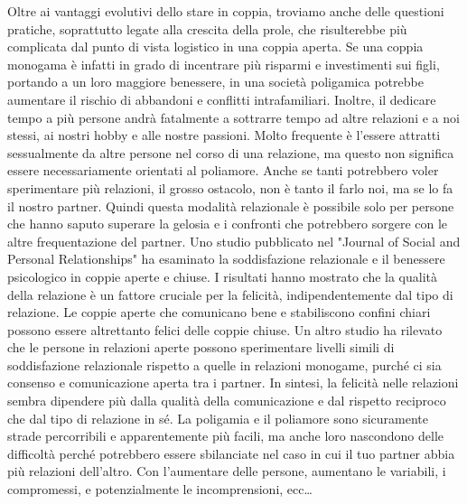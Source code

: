 \documentclass[12pt]{book} %
\begin{document}
Oltre ai vantaggi evolutivi dello stare in coppia, troviamo anche delle questioni pratiche, soprattutto legate alla
crescita della prole, che risulterebbe più complicata dal punto di vista logistico in una coppia aperta. 
Se una coppia monogama è infatti in grado di incentrare più
risparmi e investimenti sui figli, portando a un loro maggiore benessere, in una società poligamica potrebbe aumentare
il rischio di abbandoni e conflitti intrafamiliari. Inoltre, il dedicare tempo a più persone andrà
fatalmente a sottrarre tempo ad altre relazioni e a noi stessi, ai nostri hobby e alle nostre passioni. Molto frequente è l'essere 
attratti sessualmente da altre persone nel corso di una relazione, ma questo non significa essere necessariamente
orientati al poliamore. Anche se tanti potrebbero voler sperimentare più relazioni, il grosso ostacolo, non è tanto il
farlo noi, ma se lo fa il nostro partner. Quindi questa modalità relazionale è possibile solo per persone che hanno saputo superare la gelosia e i confronti che potrebbero sorgere con le altre frequentazione del partner. 
Uno studio pubblicato nel "Journal of Social and Personal Relationships" ha esaminato la soddisfazione relazionale e il benessere psicologico in coppie aperte e chiuse. I risultati hanno mostrato che la qualità della relazione è un fattore cruciale per la felicità, indipendentemente dal tipo di relazione. Le coppie aperte che comunicano bene e stabiliscono confini chiari possono essere altrettanto felici delle coppie chiuse.
Un altro studio ha rilevato che le persone in relazioni aperte possono sperimentare livelli simili di soddisfazione relazionale rispetto a quelle in relazioni monogame, purché ci sia consenso e comunicazione aperta tra i partner.
In sintesi, la felicità nelle relazioni sembra dipendere più dalla qualità della comunicazione e dal rispetto reciproco che dal tipo di relazione in sé.
La poligamia e il poliamore sono sicuramente strade percorribili e apparentemente più facili, ma anche loro nascondono delle difficoltà perché potrebbero essere sbilanciate nel caso in cui il tuo partner abbia più relazioni dell'altro. Con l'aumentare delle persone, aumentano le variabili, i compromessi, e potenzialmente le incomprensioni, ecc…
\end{document}

